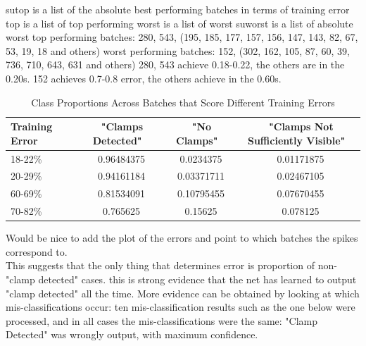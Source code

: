 \documentclass[a4paper,11pt]{article}
\begin{document}
sutop is a list of the absolute best performing batches in terms of training error
top is a list of top performing
worst is a list of worst
suworst is a list of absolute worst
top performing batches: 280, 543, (195, 185, 177, 157, 156, 147, 143, 82, 67, 53, 19, 18 and others)
worst performing batches: 152, (302, 162, 105, 87, 60, 39, 736, 710, 643, 631 and others)
280, 543 achieve 0.18-0.22, the others are in the 0.20s. 152 achieves 0.7-0.8 error, the others achieve in the 0.60s. \\

\begin{table}[h]
   \centering
    \begin{tabular}{|l|c|c|c|}
    \hline
    Training Error   & ~  "Clamps Detected"  & ~ "No Clamps"        & ~ "Clamps Not Sufficiently Visible" \\ \hline
    18-22\%          & ~  0.96484375        & ~  0.0234375         & ~  0.01171875 \\
    20-29\%          & ~  0.94161184        & ~  0.03371711        & ~  0.02467105 \\
    60-69\%          & ~  0.81534091        & ~  0.10795455        & ~  0.07670455 \\
    70-82\%          & ~  0.765625          & ~  0.15625           & ~  0.078125   \\
    \hline
    \end{tabular}
    \caption {Class Proportions Across Batches that Score Different Training Errors}
\end{table} 

Would be nice to add the plot of the errors and point to which batches the spikes correspond to. \\

This suggests that the only thing that determines error is proportion of non-"clamp detected" cases. this is strong evidence that the net has learned to output "clamp detected" all the time. More evidence can be obtained by looking at which mis-classifications occur: ten mis-classification results such as the one below were processed, and in all cases the mis-classifications were the same: "Clamp Detected" was wrongly output, with maximum confidence.\\
\end{document}
